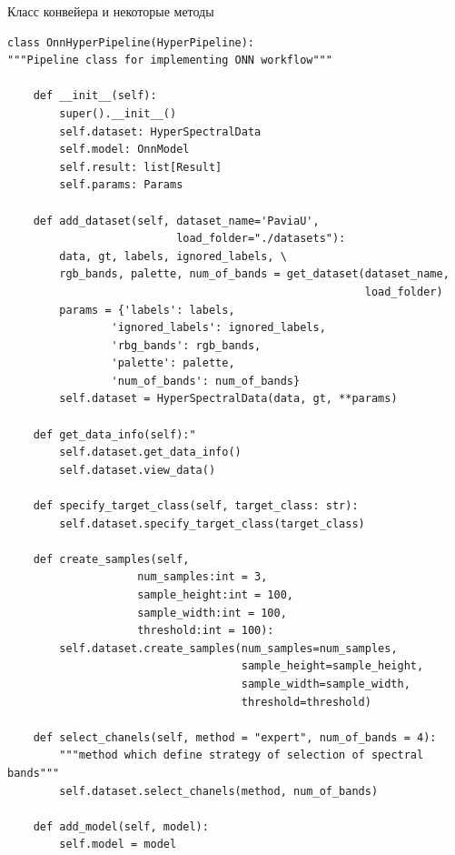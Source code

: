 \documentclass[14pt, russian]{scrartcl}
\begin{document}
\begin{listing}[H]
    \caption{Класс конвейера и некоторые методы}
    \label{lst:pipeline}
    \begin{verbatim}
class OnnHyperPipeline(HyperPipeline):
"""Pipeline class for implementing ONN workflow"""

    def __init__(self):
        super().__init__()
        self.dataset: HyperSpectralData
        self.model: OnnModel
        self.result: list[Result]
        self.params: Params

    def add_dataset(self, dataset_name='PaviaU', 
                          load_folder="./datasets"):
        data, gt, labels, ignored_labels, \
        rgb_bands, palette, num_of_bands = get_dataset(dataset_name,
                                                       load_folder)
        params = {'labels': labels, 
                'ignored_labels': ignored_labels,
                'rbg_bands': rgb_bands,
                'palette': palette,
                'num_of_bands': num_of_bands}
        self.dataset = HyperSpectralData(data, gt, **params)

    def get_data_info(self):"
        self.dataset.get_data_info()
        self.dataset.view_data()
    
    def specify_target_class(self, target_class: str):
        self.dataset.specify_target_class(target_class)

    def create_samples(self, 
                    num_samples:int = 3,
                    sample_height:int = 100,
                    sample_width:int = 100,
                    threshold:int = 100):
        self.dataset.create_samples(num_samples=num_samples, 
                                    sample_height=sample_height,
                                    sample_width=sample_width,
                                    threshold=threshold)

    def select_chanels(self, method = "expert", num_of_bands = 4):
        """method which define strategy of selection of spectral bands"""
        self.dataset.select_chanels(method, num_of_bands)

    def add_model(self, model):
        self.model = model

    \end{verbatim}
\end{listing}
\end{document}
